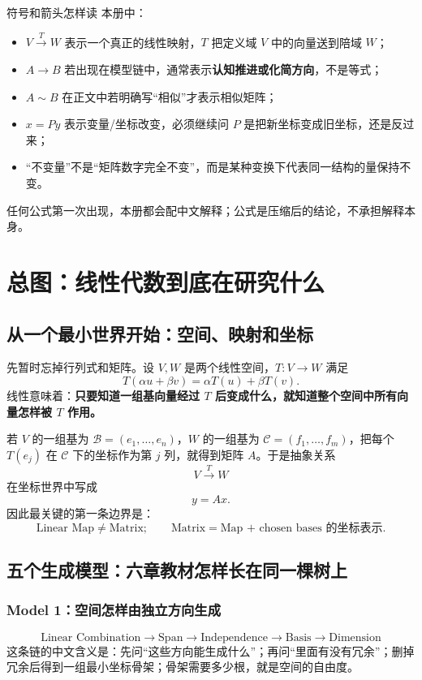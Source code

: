 \documentclass[11pt,a4paper,openany]{ctexbook}
\newcommand{\key}[1]{\textbf{\color{deep}#1}}
\begin{document}
\begin{methodbox}{符号和箭头怎样读}
本册中：
\begin{itemize}
  \item $V\xrightarrow{T}W$ 表示一个真正的线性映射，$T$ 把定义域 $V$ 中的向量送到陪域 $W$；
  \item $A\to B$ 若出现在模型链中，通常表示\key{认知推进或化简方向}，不是等式；
  \item $A\sim B$ 在正文中若明确写“相似”才表示相似矩阵；
  \item $x=Py$ 表示变量/坐标改变，必须继续问 $P$ 是把新坐标变成旧坐标，还是反过来；
  \item “不变量”不是“矩阵数字完全不变”，而是某种变换下代表同一结构的量保持不变。
\end{itemize}
任何公式第一次出现，本册都会配中文解释；公式是压缩后的结论，不承担解释本身。
\end{methodbox}

\tableofcontents
\mainmatter

\chapter{总图：线性代数到底在研究什么}

\section{从一个最小世界开始：空间、映射和坐标}
先暂时忘掉行列式和矩阵。设 $V,W$ 是两个线性空间，$T:V\to W$ 满足
\[
T(\alpha u+\beta v)=\alpha T(u)+\beta T(v).
\]
线性意味着：\key{只要知道一组基向量经过 $T$ 后变成什么，就知道整个空间中所有向量怎样被 $T$ 作用。}

若 $V$ 的一组基为 $\mathcal B=(e_1,\dots,e_n)$，$W$ 的一组基为 $\mathcal C=(f_1,\dots,f_m)$，把每个 $T(e_j)$ 在 $\mathcal C$ 下的坐标作为第 $j$ 列，就得到矩阵 $A$。于是抽象关系
\[
V\xrightarrow{T}W
\]
在坐标世界中写成
\[
\boxed{y=Ax}.
\]
因此最关键的第一条边界是：
\[
\boxed{\text{Linear Map}\neq\text{Matrix};\qquad \text{Matrix}=\text{Map + chosen bases 的坐标表示}.}
\]

\section{五个生成模型：六章教材怎样长在同一棵树上}

\subsection{Model 1：空间怎样由独立方向生成}
\[
\boxed{\text{Linear Combination}\to\text{Span}\to\text{Independence}\to\text{Basis}\to\text{Dimension}}
\]
这条链的中文含义是：先问“这些方向能生成什么”；再问“里面有没有冗余”；删掉冗余后得到一组最小坐标骨架；骨架需要多少根，就是空间的自由度。
\end{document}
